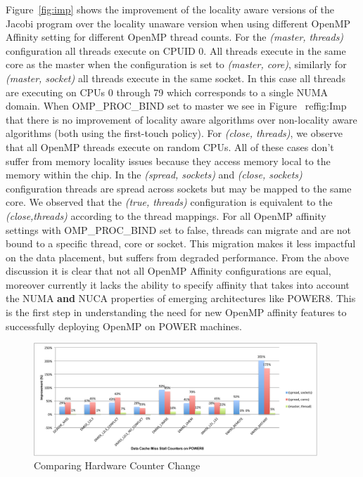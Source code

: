 Figure~\ref{fig:imp} shows the improvement of the locality aware versions of the Jacobi program over the locality unaware version when using different OpenMP Affinity setting for different OpenMP thread counts. 
For the \textit{(master, threads)} configuration all threads execute on CPUID 0. 
All threads execute in the same core as the master when the configuration is set to \textit{(master, core)}, similarly for \textit{(master, socket)} all threads execute in the same socket. In this case all threads are executing on CPUs 0 through 79 which corresponds to a single NUMA domain. When OMP\_PROC\_BIND set to master we see in Figure ~ref{fig:Imp} that there is no improvement of locality aware algorithms over non-locality aware algorithms (both using the first-touch policy).
For \textit{(close, threads)}, we observe that all OpenMP threads execute on random CPUs. %
All of these cases don't suffer from memory locality issues because they access memory local to the memory within the chip.
In the \textit{(spread, sockets)} and \textit{(close, sockets)} configuration threads are spread across sockets but may be mapped to the same core. We observed that the \textit{(true, threads)} configuration is equivalent to the \textit{(close,threads)} according to the thread mappings.
For all OpenMP affinity settings  with OMP\_PROC\_BIND set to false, threads can migrate and are not bound to a specific thread, core or socket. This migration makes it less impactful on the data placement, but suffers from degraded performance.
From the above discussion it is clear that not all OpenMP Affinity configurations are equal, moreover currently it lacks the ability to specify affinity that takes into account the NUMA \textbf{and} NUCA properties of emerging architectures like POWER8. This is the first step in understanding the need for new OpenMP affinity features to successfully deploying OpenMP on POWER machines. %
\begin{figure}[h!]
  \centering
  \includegraphics[height=0.4\textwidth, width=0.95\textwidth]{./Images/HW.pdf}
       \caption{Comparing Hardware Counter Change}
       \label{fig:HW}
\end{figure}
